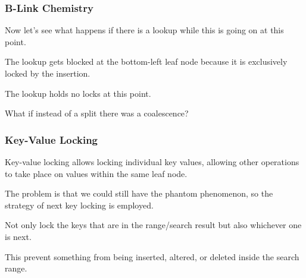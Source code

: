 \begin{frame}
\frametitle{B-Link Chemistry}

Now let's see what happens if there is a lookup while this is going on at this point. 

The lookup gets blocked at the bottom-left leaf node because it is exclusively locked by the insertion. 

The lookup holds no locks at this point.

What if instead of a split there was a coalescence?

\end{frame}



\begin{frame}
\frametitle{Key-Value Locking}

Key-value locking allows locking individual key values, allowing other operations to take place on values within the same leaf node.

The problem is that we could still have the phantom phenomenon, so the strategy of \alert{next key locking} is employed. 

Not only lock the keys that are in the range/search result but also whichever one is next. 

This prevent something from being inserted, altered, or deleted inside the search range. 


\end{frame}












